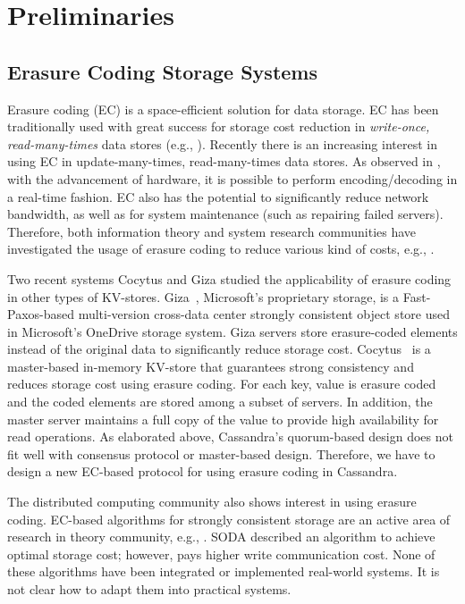 \section{Preliminaries}

\subsection{Erasure Coding Storage Systems}
Erasure coding (EC) is a space-efficient solution for data storage. 
EC has been traditionally used with great success for storage cost reduction in \textit{write-once, read-many-times} data stores (e.g., \cite{rashmi_fast15, dimakis2011survey, sathiamoorthy, HuaSimXu_etal_azure}). Recently there is an increasing interest in using EC in update-many-times, read-many-times data stores. As observed in \cite{Cocytus2016,GIZA2017}, with the advancement of hardware, it is possible to perform encoding/decoding in a real-time fashion.
EC also has the potential to significantly reduce network bandwidth, as well as for system maintenance (such as repairing failed servers).
Therefore, both information theory and system research communities have investigated the usage of erasure coding to reduce various kind of costs, e.g., \cite{dimakis2010network, rashmi2016ec, tamo2014family}.

Two recent systems Cocytus \cite{Cocytus2016} and Giza \cite{GIZA2017} studied the applicability of erasure coding in other types of KV-stores. 
Giza~\cite{GIZA2017}, Microsoft's proprietary storage,  is a Fast-Paxos-based  multi-version cross-data center strongly consistent object store used in Microsoft's OneDrive storage system. Giza servers store erasure-coded elements instead of the original data to significantly reduce storage cost. 
Cocytus~\cite{Cocytus2016} is a master-based in-memory KV-store that guarantees strong consistency and reduces storage cost using erasure coding.  For each key,  value is erasure coded and the coded elements are stored among a subset of servers. In addition, the master server maintains a full copy of the value to provide high availability for read operations. 
As elaborated above, Cassandra's quorum-based design does not fit well with consensus protocol or master-based design.
Therefore, we have to design a new EC-based protocol for using erasure coding in Cassandra.


The distributed computing community also shows interest in using erasure coding.
EC-based algorithms for strongly consistent storage are an active area of research in theory community, e.g., \cite{CadambeLMM17, SODA2016, LDS2017, NicolaouC0KML19}.  SODA\cite{SODA2016} described an algorithm to achieve optimal storage cost; however, pays higher write communication cost. 
None of these algorithms have been integrated or implemented real-world systems. It is not clear how to adapt them into practical systems.


